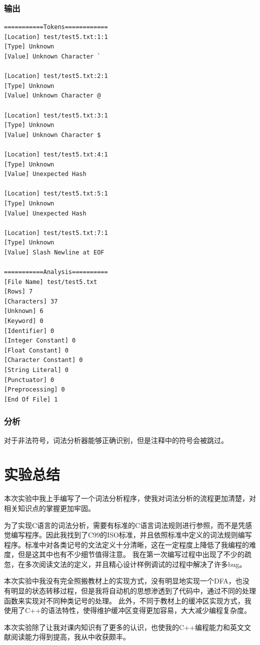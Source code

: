 \documentclass[lang=cn,11pt,a4paper,cite=authornum]{paper}
\begin{document}
\subsubsection{输出}

\begin{code}
\begin{verbatim}
===========Tokens============
[Location] test/test5.txt:1:1
[Type] Unknown
[Value] Unknown Character `

[Location] test/test5.txt:2:1
[Type] Unknown
[Value] Unknown Character @

[Location] test/test5.txt:3:1
[Type] Unknown
[Value] Unknown Character $

[Location] test/test5.txt:4:1
[Type] Unknown
[Value] Unexpected Hash

[Location] test/test5.txt:5:1
[Type] Unknown
[Value] Unexpected Hash

[Location] test/test5.txt:7:1
[Type] Unknown
[Value] Slash Newline at EOF

===========Analysis==========
[File Name] test/test5.txt
[Rows] 7
[Characters] 37
[Unknown] 6
[Keyword] 0
[Identifier] 0
[Integer Constant] 0
[Float Constant] 0
[Character Constant] 0
[String Literal] 0
[Punctuator] 0
[Preprocessing] 0
[End Of File] 1
\end{verbatim}
\end{code}

\subsubsection{分析}

对于非法符号，词法分析器能够正确识别，但是注释中的符号会被跳过。

\section{实验总结}

本次实验中我上手编写了一个词法分析程序，使我对词法分析的流程更加清楚，对相关知识点的掌握更加牢固。

为了实现C语言的词法分析，需要有标准的C语言词法规则进行参照，而不是凭感觉编写程序。因此我找到了C99的ISO标准，并且依照标准中定义的词法规则编写程序。标准中对各类记号的文法定义十分清晰，这在一定程度上降低了我编程的难度，但是这其中也有不少细节值得注意。
我在第一次编写过程中出现了不少的疏忽，在多次阅读文法的定义，并且精心设计样例调试的过程中解决了许多bug。

本次实验中我没有完全照搬教材上的实现方式，没有明显地实现一个DFA，也没有明显的状态转移过程，但是我将自动机的思想渗透到了代码中，通过不同的处理函数来实现对不同种类记号的处理。
此外，不同于教材上的缓冲区实现方式，我使用了C++的语法特性，使得维护缓冲区变得更加容易，大大减少编程复杂度。

本次实验除了让我对课内知识有了更多的认识，也使我的C++编程能力和英文文献阅读能力得到提高，我从中收获颇丰。
\end{document}
